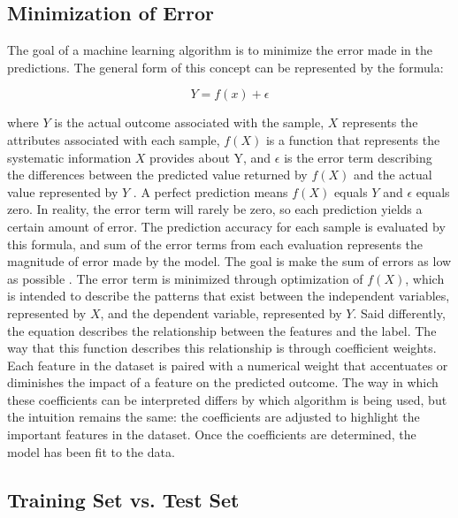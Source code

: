 \documentclass[sigconf]{acmart}
\begin{document}
\subsection{Minimization of Error}

The goal of a machine learning algorithm is to minimize the error made in the predictions. The general form of this concept can be represented by the formula:

\[Y = f(x) + \epsilon\]

where \(Y\) is the actual outcome associated with the sample, \(X\) represents the attributes associated with each sample, \(f(X)\) is a function that represents the systematic information \(X\) provides about Y, and \(\epsilon\) is the error term describing the differences between the predicted value returned by \(f(X)\) and the actual value represented by \(Y\) \cite{cite03}. A perfect prediction means \(f(X)\) equals \(Y\) and \(\epsilon\) equals zero. In reality, the error term will rarely be zero, so each prediction yields a certain amount of error. The prediction accuracy for each sample is evaluated by this formula, and sum of the error terms from each evaluation represents the magnitude of error made by the model. The goal is make the sum of errors as low as possible \cite{cite03}.
The error term is minimized through optimization of \(f(X)\), which is intended to describe the patterns that exist between the independent variables, represented by \(X\), and the dependent variable, represented by \(Y\). Said differently, the equation describes the relationship between the features and the label. The way that this function describes this relationship is through coefficient weights. Each feature in the dataset is paired with a numerical weight that accentuates or diminishes the impact of a feature on the predicted outcome. The way in which these coefficients can be interpreted differs by which algorithm is being used, but the intuition remains the same: the coefficients are adjusted to highlight the important features in the dataset. Once the coefficients are determined, the model has been fit to the data.

\subsection{Training Set vs. Test Set}
\end{document}
